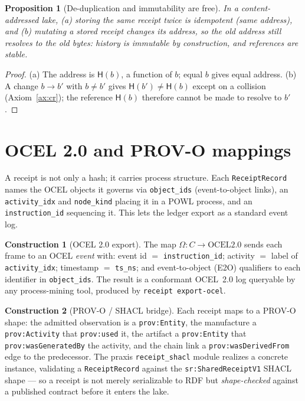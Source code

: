 \documentclass[11pt,oneside]{book}
\theoremstyle{definition}
\newtheorem{construction}{Construction}[chapter]
\theoremstyle{plain}
\newtheorem{proposition}[theorem]{Proposition}
\theoremstyle{remark}
\newcommand{\chainH}{\mathsf{H}}               %
\newcommand{\code}[1]{\texttt{#1}}
\newcommand{\Ledger}{C}               %
\begin{document}
\begin{proposition}[De-duplication and immutability are free]\label{prop:cas}
In a content-addressed lake, (a) storing the same receipt twice is idempotent (same address),
and (b) mutating a stored receipt changes its address, so the old address still resolves to the
old bytes: history is immutable by construction, and references are stable. %
\end{proposition}

\begin{proof}
(a) The address is $\chainH(b)$, a function of $b$; equal $b$ gives equal address. (b) A change
$b\to b'$ with $b\ne b'$ gives $\chainH(b')\ne\chainH(b)$ except on a collision
(Axiom~\ref{ax:cr}); the reference $\chainH(b)$ therefore cannot be made to resolve to $b'$. %
\end{proof}

\section{OCEL 2.0 and PROV-O mappings}

A receipt is not only a hash; it carries process structure. %
Each \code{ReceiptRecord} names the
OCEL objects it governs via \code{object\_ids} (event-to-object links), an \code{activity\_idx}
and \code{node\_kind} placing it in a POWL process, and an \code{instruction\_id} sequencing it. %
This lets the ledger export as a standard event log. %

\begin{construction}[OCEL 2.0 export]\label{con:ocel}
The map $\Omega:\Ledger\to\mathrm{OCEL2.0}$ sends each frame to an OCEL \emph{event} with:
event id $=$ \code{instruction\_id}; activity $=$ label of \code{activity\_idx}; timestamp
$=$ \code{ts\_ns}; and event-to-object (E2O) qualifiers to each identifier in
\code{object\_ids}. %
The result is a conformant OCEL~2.0 log queryable by any process-mining
tool, produced by \code{receipt export-ocel}. %
\end{construction}

\begin{construction}[PROV-O / SHACL bridge]\label{con:provo}
Each receipt maps to a PROV-O~\cite{provo} shape: the admitted observation is a
\code{prov:Entity}, the manufacture a \code{prov:Activity} that \code{prov:used} it, the
artifact a \code{prov:Entity} that \code{prov:wasGeneratedBy} the activity, and the chain link
a \code{prov:wasDerivedFrom} edge to the predecessor. %
The praxis \code{receipt\_shacl} module
realizes a concrete instance, validating a \code{ReceiptRecord} against the
\code{sr:SharedReceiptV1} SHACL shape --- so a receipt is not merely serializable to RDF but
\emph{shape-checked} against a published contract before it enters the lake. %
\end{construction}
\end{document}
